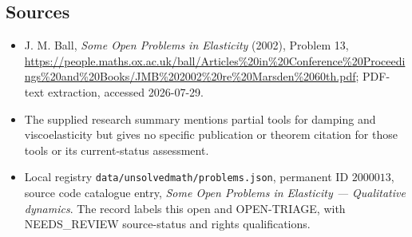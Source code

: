 \documentclass[11pt]{article}
\begin{document}
\subsection{Sources}
\begin{itemize}
\item J. M. Ball, \emph{Some Open Problems in Elasticity} (2002), Problem 13, \url{https://people.maths.ox.ac.uk/ball/Articles%20in%20Conference%20Proceedings%20and%20Books/JMB%202002%20re%20Marsden%2060th.pdf}; PDF-text extraction, accessed 2026-07-29.
\item The supplied research summary mentions partial tools for damping and viscoelasticity but gives no specific publication or theorem citation for those tools or its current-status assessment.
\item Local registry \texttt{data/unsolvedmath/problems.json}, permanent ID $2000013$, source code catalogue entry, \emph{Some Open Problems in Elasticity --- Qualitative dynamics}. The record labels this open and OPEN-TRIAGE, with NEEDS\_REVIEW source-status and rights qualifications.
\end{itemize}
\end{document}

